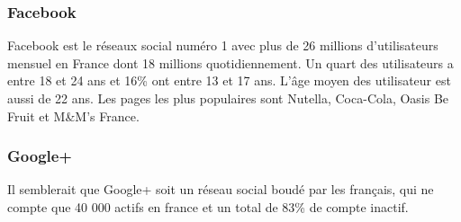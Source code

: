 \subsubsection{Facebook}
Facebook est le réseaux social numéro 1 avec plus de 26 millions d'utilisateurs mensuel en France dont 18 millions quotidiennement. Un quart des utilisateurs a entre 18 et 24 ans et 16\% ont entre 13 et 17 ans. L'âge moyen des utilisateur est aussi de 22 ans.
Les pages les plus populaires sont Nutella, Coca-Cola, Oasis Be Fruit et M\&M's France. 

\subsubsection{Google+}
Il semblerait que Google+ soit un réseau social boudé par les français, qui ne compte que 40 000 actifs en france et un total de 83\% de compte inactif.